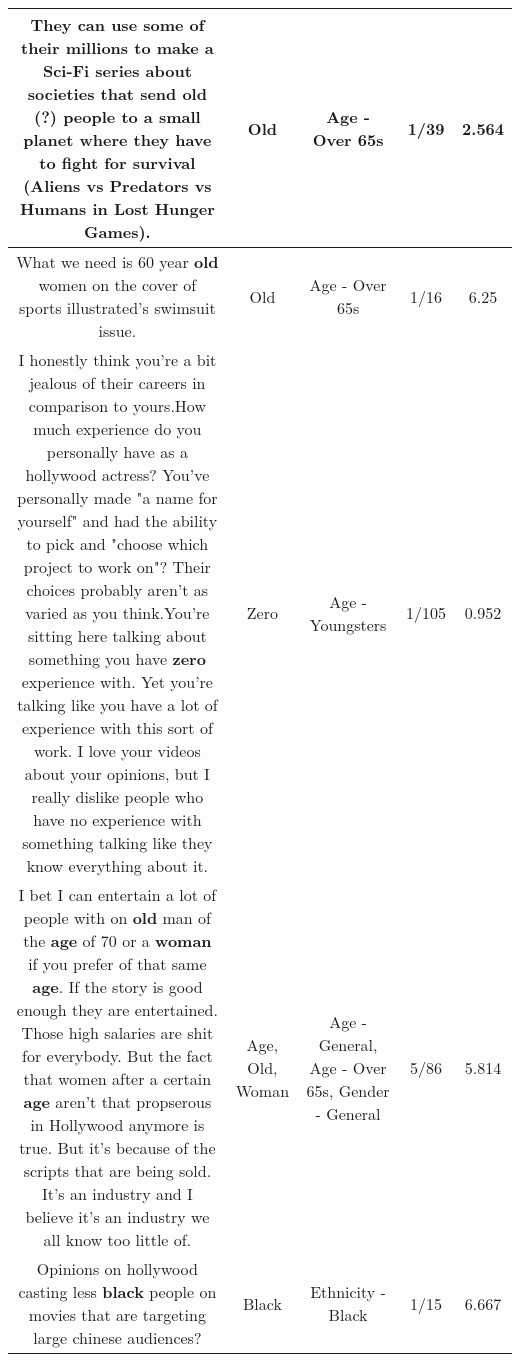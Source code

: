 \documentclass[11pt]{article}
\newlength\mylength
\begin{document}
\begin{center}
\begin{longtable}{|C{.65\mylength}|C{.30\mylength}|C{.12\mylength}|C{.12\mylength}|C{.12\mylength}|}
  \small They can use some of their millions to make a Sci-Fi series about societies that send \textbf{old} (?) people to a small planet where they have to fight for survival (Aliens vs Predators vs Humans in Lost Hunger Games).\normalsize   & Old & Age - Over 65s & 1/39 & 2.564 \\  \hline
  \small What we need is 60 year \textbf{old} women on the cover of sports illustrated's  swimsuit issue.\normalsize   & Old & Age - Over 65s & 1/16 & 6.25 \\  \hline
  \small I honestly think you're a bit jealous of their careers in comparison to yours.How much experience do you personally have as a hollywood actress? You've personally made "a name for yourself" and had the ability to pick and "choose which project to work on"? Their choices probably aren't as varied as you think.You're sitting here talking about something you have \textbf{zero} experience with. Yet you're talking like you have a lot of experience with this sort of work. I love your videos about your opinions, but I really dislike people who have no experience with something talking like they know everything about it.\normalsize   & Zero & Age - Youngsters & 1/105 & 0.952 \\  \hline
  \small I bet I can entertain a lot of people with on \textbf{old} man of the \textbf{age} of 70 or a \textbf{woman} if you prefer of that same \textbf{age}. If the story is good enough they are entertained. Those high salaries are shit for everybody. But the fact that women after a certain \textbf{age} aren't that propserous in Hollywood anymore is true. But it's because of the scripts that are being sold. It's an industry and I believe it's an industry we all know too little of.\normalsize   & Age, Old, Woman & Age - General, Age - Over 65s, Gender - General & 5/86 & 5.814 \\  \hline
  \small Opinions on hollywood casting less \textbf{black} people on movies that are targeting large chinese audiences?\normalsize   & Black & Ethnicity - Black & 1/15 & 6.667 \\  \hline

\end{longtable}
\end{center}
\end{document}
